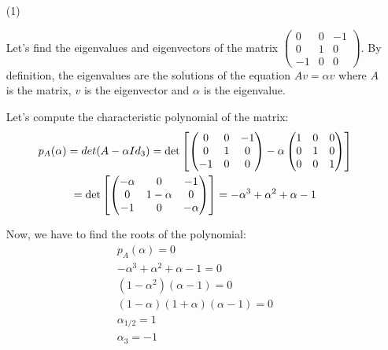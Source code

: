 \documentclass[12pt]{article}
\begin{document}
\begin{enumerate}
     
\item[(1)]

Let's find the eigenvalues and eigenvectors of the matrix 
$
\begin{pmatrix}
    0 & 0 & -1 \\ 0 & 1 & 0 \\ -1 & 0 & 0
\end{pmatrix}
$.
By definition, the eigenvalues are the solutions of the equation
$Av = \alpha v$
where $A$ is the matrix, $v$ is the eigenvector and $\alpha$ is the eigenvalue.

Let's compute the characteristic polynomial of the matrix:
\begin{gather*}
p_A(\alpha) = det(A-\alpha Id_3) 
= \det\mqty[
\begin{pmatrix}
0 & 0 & -1 \\ 0 & 1 & 0 \\ -1 & 0 & 0
\end{pmatrix}
- \alpha
\begin{pmatrix}
1 & 0 & 0 \\ 0 & 1 & 0 \\ 0 & 0 & 1
\end{pmatrix}] \\
= \det\mqty[
\begin{pmatrix}
-\alpha & 0 & -1 \\ 0 & 1 - \alpha & 0 \\ -1 & 0 & - \alpha
\end{pmatrix}]
= -\alpha^3 + \alpha^2 + \alpha - 1
\end{gather*}

Now, we have to find the roots of the polynomial:
\begin{gather*}
    p_A(\alpha) = 0 \\
    -\alpha^3 + \alpha^2 + \alpha - 1 = 0 \\
    (1-\alpha^2)(\alpha-1) = 0 \\
    (1-\alpha)(1+\alpha)(\alpha-1) = 0 \\
    \alpha_{1/2} = 1 \\ \alpha_3 = -1
\end{gather*}


\end{enumerate}
\end{document}
